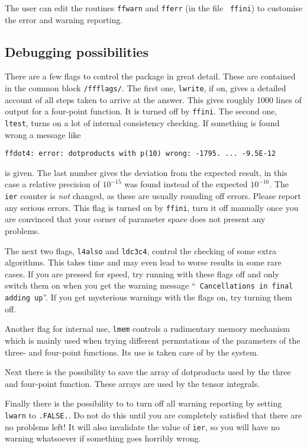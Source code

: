 The user can edit the routines {\tt ffwarn} and {\tt fferr} (in the file {\tt 
ffini}) to customise the error and warning reporting.

\subsection{Debugging possibilities}
\label{sec:debugging}

There are a few flags to control the package in great detail.  These are 
contained in the common block {\tt /ffflags/}.  The first one, {\tt lwrite}, 
if on, gives a detailed account of all steps taken to arrive at the answer.  
This gives roughly 1000 lines of output for a four-point function.  It is 
turned off by {\tt ffini}.  The second one, {\tt ltest}, turns on a lot of 
internal consistency checking.  If something is found wrong a message like
\begin{verbatim}
ffdot4: error: dotproducts with p(10) wrong: -1795. ... -9.5E-12
\end{verbatim}
is given.  The last number gives the deviation from the expected result, in 
this case a relative precision of $10^{-15}$ was found instead of the expected 
$10^{-16}$.  The {\tt ier} counter is {\em not} changed, as these are usually 
rounding off errors.  Please report any serious errors.  This flag is 
turned on by {\tt ffini}, turn it off manually once you are convinced that 
your corner of parameter space does not present any problems.

The next two flags, {\tt l4also} and {\tt ldc3c4}, control the checking of 
some extra algorithms.  This takes time and may even lead to worse results in 
some rare cases.  If you are pressed for speed, try running with these flags 
off and only switch them on when you get the warning message ``{\tt 
Cancellations in final adding up}''.  If you get mysterious warnings with the 
flags on, try turning them off.

Another flag for internal use, {\tt lmem} controls a rudimentary memory 
mechanism which is mainly used when trying different permutations of the 
parameters of the three- and four-point functions.  Its use is taken care of 
by the system.

Next there is the possibility to save the array of dotproducts used by the 
three and four-point function.  These arrays are used by the tensor integrals.

Finally there is the possibility to to turn off all warning reporting by 
setting {\tt lwarn} to {\tt .FALSE.}.  Do not do this until you are completely 
satisfied that there are no problems left!  It 
will also invalidate the value of {\tt ier}, so you will have no warning 
whatsoever if something goes horribly wrong.


